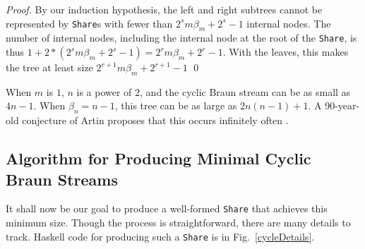 \documentclass[envcountsect]{llncs}
\newcommand{\share}{{\tt Share} }
\begin{document}
\begin{proof}
By our induction hypothesis, the left and right subtrees cannot be represented by {\tt Share}s with fewer than $2^s m \beta_m + 2^s - 1$ internal nodes.
The number of internal nodes, including the internal node at the root of the {\tt Share}, is thus $1+2*(2^s m \beta_m + 2^s - 1) = 2^r m \beta_m + 2^r - 1$.
With the leaves, this makes the tree at least size $2^{r+1} m \beta_m + 2^{r+1} - 1$
\qed
\end{proof}

When $m$ is $1$, $n$ is a power of $2$, and the cyclic Braun stream can be as small as $4n-1$.
When $\beta_n = n-1$, this tree can be as large as $2n(n-1)+1$.
A 90-year-old conjecture of Artin proposes that this occurs infinitely often \cite{artin}.

\subsection{Algorithm for Producing Minimal Cyclic Braun Streams}
\label{cycleAlgo}

It shall now be our goal to produce a well-formed \share that achieves this minimum size.
Though the process is straightforward, there are many details to track.
Haskell code for producing such a \share is in Fig.~\ref{cycleDetails}.
\end{document}
